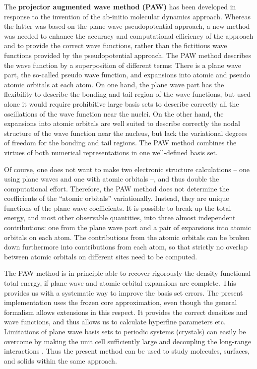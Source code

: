 \documentclass[final,12pt]{article}
\begin{document}
The {\bf projector augmented wave method (PAW)}
\cite{bloechl94_prb50_17953} has been developed in response to the
invention of the ab-initio molecular dynamics approach. Whereas the
latter was based on the plane wave pseudopotential approach, a new
method was needed to enhance the accuracy and computational efficiency
of the approach and to provide the correct wave functions, rather than
the fictitious wave functions provided by the pseudopotential
approach.  The PAW method describes the wave function by a
superposition of different terms: There is a plane wave part, the
so-called pseudo wave function, and expansions into atomic and pseudo
atomic orbitals at each atom. On one hand, the plane wave part has the
flexibility to describe the bonding and tail region of the wave
functions, but used alone it would require prohibitive large basis
sets to describe correctly all the oscillations of the wave function
near the nuclei. On the other hand, the expansions into atomic
orbitals are well suited to describe correctly the nodal structure of
the wave function near the nucleus, but lack the variational degrees
of freedom for the bonding and tail regions.  The PAW method combines
the virtues of both numerical representations in one well-defined
basis set.

Of course, one does not want to make two electronic structure
calculations  -- one using plane waves and one with atomic
orbitals --, and thus double the computational effort. Therefore, the
PAW method does not determine the coefficients of the ``atomic orbitals''
variationally. Instead, they are unique functions of the plane wave
coefficients. It is possible to break up the total energy, and most
other observable quantities, into three almost independent
contributions: one from the plane wave part and a pair of expansions
into atomic orbitals on each atom. The contributions from the atomic
orbitals can be broken down furthermore into contributions from each atom,
so that strictly no overlap between atomic orbitals on different sites
need to be computed.

The PAW method is in principle able to recover rigorously the density
functional total energy, if plane wave and atomic orbital expansions are
complete. This provides us with a systematic way to improve the basis set
errors.  The present implementation uses the frozen core approximation, even
though the general formalism allows extensions in this respect. It provides
the correct densities and wave functions, and thus allows us to calculate
hyperfine parameters etc.  Limitations of plane wave basis sets to periodic
systems (crystals) can easily be overcome by making the unit cell sufficiently
large and decoupling the long-range interactions
\cite{bloechl95_jcp103_7422}. Thus the present method can be used to study
molecules, surfaces, and solids within the same approach.
\end{document}
